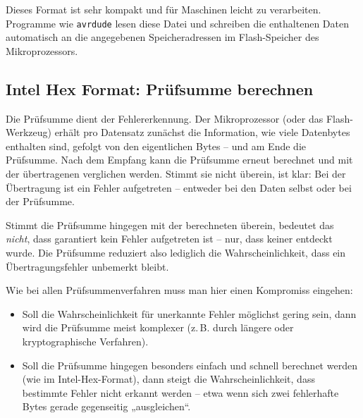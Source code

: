 \documentclass[a4paper,12pt]{article}
\begin{document}
\noindent
Dieses Format ist sehr kompakt und für Maschinen leicht zu verarbeiten.
Programme wie \texttt{avrdude} lesen diese Datei und schreiben die enthaltenen
Daten automatisch an die angegebenen Speicheradressen im Flash-Speicher des
Mikroprozessors.


\subsection{Intel Hex Format: Prüfsumme berechnen}

Die Prüfsumme dient der Fehlererkennung.  Der Mikroprozessor (oder das
Flash-Werkzeug) erhält pro Datensatz zunächst die Information, wie viele
Datenbytes enthalten sind, gefolgt von den eigentlichen Bytes – und am Ende die
Prüfsumme.  Nach dem Empfang kann die Prüfsumme erneut berechnet und mit der
übertragenen verglichen werden. Stimmt sie nicht überein, ist klar: Bei der
Übertragung ist ein Fehler aufgetreten – entweder bei den Daten selbst oder bei
der Prüfsumme.

Stimmt die Prüfsumme hingegen mit der berechneten überein, bedeutet das
\textit{nicht}, dass garantiert kein Fehler aufgetreten ist – nur, dass keiner
entdeckt wurde. Die Prüfsumme reduziert also lediglich die Wahrscheinlichkeit,
dass ein Übertragungsfehler unbemerkt bleibt.

Wie bei allen Prüfsummenverfahren muss man hier einen Kompromiss eingehen:

\begin{itemize}
    \item
	Soll die Wahrscheinlichkeit für unerkannte Fehler möglichst gering
	sein, dann wird die Prüfsumme meist komplexer (z.\,B. durch längere
	oder kryptographische Verfahren).
    \item
	Soll die Prüfsumme hingegen besonders einfach und schnell berechnet
	werden (wie im Intel-Hex-Format), dann steigt die Wahrscheinlichkeit,
	dass bestimmte Fehler nicht erkannt werden – etwa wenn sich zwei
	fehlerhafte Bytes gerade gegenseitig „ausgleichen“.
\end{itemize}
\end{document}
